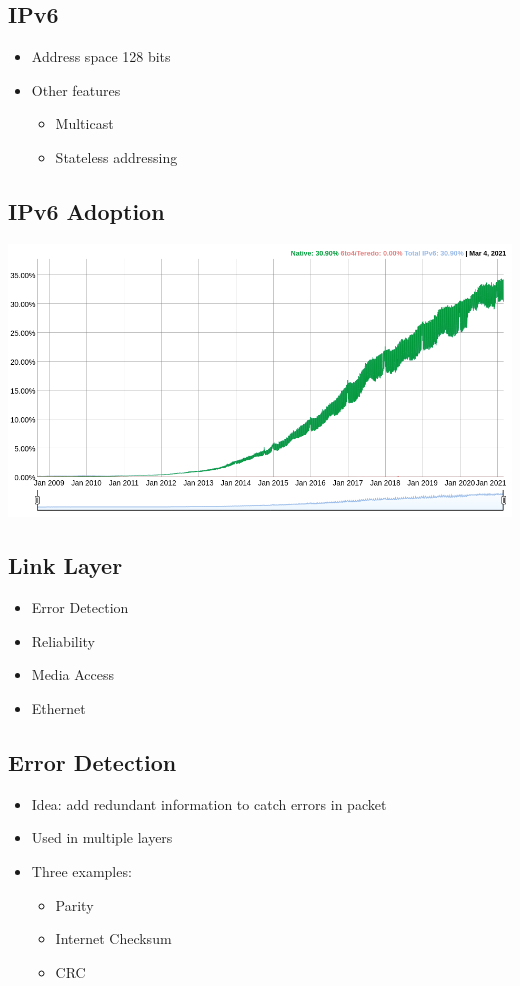 \subsection{IPv6}
\begin{itemize}[nosep]
    \item Address space 128 bits
    \item Other features
          \begin{itemize}[nosep]
              \item Multicast
              \item Stateless addressing
          \end{itemize}
\end{itemize}

\subsection{IPv6 Adoption}
\includegraphics[scale=0.5]{lazy/ipv6adoption.png}

\subsection{Link Layer}
\begin{itemize}[nosep]
    \item Error Detection
    \item Reliability
    \item Media Access
    \item Ethernet
\end{itemize}

\subsection{Error Detection}
\begin{itemize}[nosep]
    \item Idea: add redundant information to catch errors in packet
    \item Used in multiple layers
    \item Three examples:
          \begin{itemize}[nosep]
              \item Parity
              \item Internet Checksum
              \item CRC
          \end{itemize}
\end{itemize}

